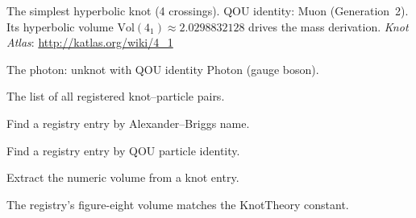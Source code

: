 \begin{definition}
  \label{def:figure-eight}
  \leanok
  The simplest hyperbolic knot (4 crossings).
  QOU identity: Muon (Generation~2).  Its hyperbolic volume
  $\mathrm{Vol}(4_1) \approx 2.0298832128$ drives the mass derivation.
  \textit{Knot Atlas}: \url{http://katlas.org/wiki/4_1}
\end{definition}

\begin{definition}
  \label{def:photon}
  \leanok
  The photon: unknot with QOU identity Photon (gauge boson).
\end{definition}

\begin{definition}
  \label{def:knot-registry}
  \leanok
  The list of all registered knot--particle pairs.
\end{definition}

\begin{definition}
  \label{def:registry-lookup}
  \leanok
  Find a registry entry by Alexander--Briggs name.
\end{definition}

\begin{definition}
  \label{def:registry-lookup-identity}
  \leanok
  Find a registry entry by QOU particle identity.
\end{definition}

\begin{definition}
  \label{def:volume-value}
  \leanok
  Extract the numeric volume from a knot entry.
\end{definition}

\begin{theorem}
  \label{thm:figure-eight-volume-consistent}
  \leanok
  The registry's figure-eight volume matches the KnotTheory constant.
\end{theorem}

